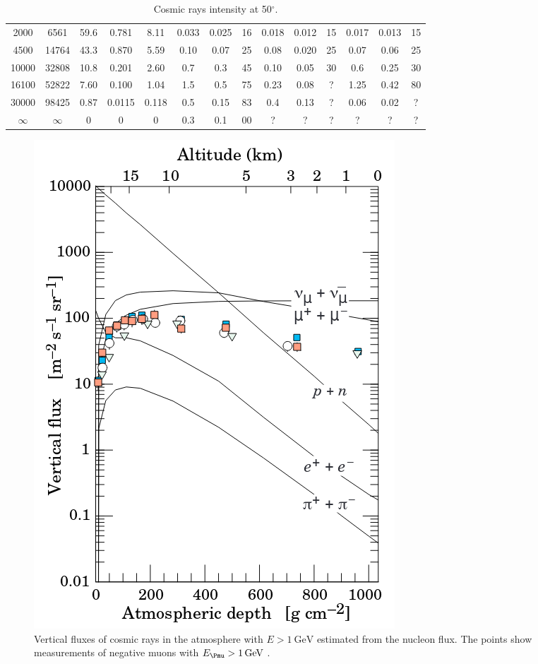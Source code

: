 \begin{table}
\begin{tabular}{|c|c|c|c|c|c|c|c|c|c|c|c|c|c|}
2000 & 6561 & 59.6 & 0.781 & 8.11 & 0.033 & 0.025 & 16 & 0.018 & 0.012 & 15 & 0.017 & 0.013 & 15 \\
4500 & 14764 & 43.3 & 0.870 & 5.59 & 0.10 & 0.07 & 25 & 0.08 & 0.020 & 25 & 0.07 & 0.06 & 25 \\
10000 & 32808 & 10.8 & 0.201 & 2.60 & 0.7 & 0.3 & 45 & 0.10 & 0.05 & 30 & 0.6 & 0.25 & 30 \\
16100 & 52822 & 7.60 & 0.100 & 1.04 & 1.5 & 0.5 & 75 & 0.23 & 0.08 & ? & 1.25 & 0.42 & 80 \\
30000 & 98425 & 0.87 & 0.0115 & 0.118 & 0.5 & 0.15 & 83 & 0.4 & 0.13 & ? & 0.06 & 0.02 & ? \\
$\infty$ & $\infty$ & 0 & 0 & 0 & 0.3 & 0.1 & 00 & ? & ? & ? & ? & ? & ? \\ \hline
\end{tabular}
\caption{Cosmic rays intensity at 50$^\circ$.}
\label{tab:flx}
\end{table}

\begin{figure}[htbp]
\centering
\includegraphics[width=0.5\linewidth]{./fig/cosflux.png}
\caption{Vertical fluxes of cosmic rays in the atmosphere with $E>\SI{1}{\giga\electronvolt}$ estimated from the nucleon flux. The points show measurements of negative muons with $E_{\Pmu} > \SI{1}{\giga\electronvolt}$ \cite{Tanabashi:2018oca}.}
\label{fig:cosflux}
\end{figure}


